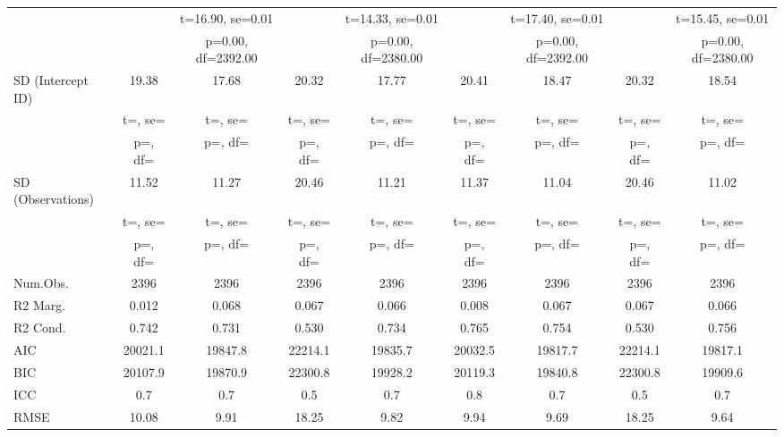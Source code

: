 \documentclass[]{report}
\begin{document}
\begin{table}
{\begin{tabular}[t]{lcccccccc}
			&  & t=\num{16.90}, se=\num{0.01} &  & t=\num{14.33}, se=\num{0.01} &  & t=\num{17.40}, se=\num{0.01} &  & t=\num{15.45}, se=\num{0.01}\\
			&  & p=\num{0.00}, df=\num{2392.00} &  & p=\num{0.00}, df=\num{2380.00} &  & p=\num{0.00}, df=\num{2392.00} &  & p=\num{0.00}, df=\num{2380.00}\\
			SD (Intercept ID) & \num{19.38} & \num{17.68} & \num{20.32} & \num{17.77} & \num{20.41} & \num{18.47} & \num{20.32} & \num{18.54}\\
			& t=, se= & t=, se= & t=, se= & t=, se= & t=, se= & t=, se= & t=, se= & t=, \vphantom{1} se=\\
			& p=, df= & p=, df= & p=, df= & p=, df= & p=, df= & p=, df= & p=, df= & p=, \vphantom{1} df=\\
			SD (Observations) & \num{11.52} & \num{11.27} & \num{20.46} & \num{11.21} & \num{11.37} & \num{11.04} & \num{20.46} & \num{11.02}\\
			& t=, se= & t=, se= & t=, se= & t=, se= & t=, se= & t=, se= & t=, se= & t=, se=\\
			& p=, df= & p=, df= & p=, df= & p=, df= & p=, df= & p=, df= & p=, df= & p=, df=\\
			\midrule
			Num.Obs. & \num{2396} & \num{2396} & \num{2396} & \num{2396} & \num{2396} & \num{2396} & \num{2396} & \num{2396}\\
			R2 Marg. & \num{0.012} & \num{0.068} & \num{0.067} & \num{0.066} & \num{0.008} & \num{0.067} & \num{0.067} & \num{0.066}\\
			R2 Cond. & \num{0.742} & \num{0.731} & \num{0.530} & \num{0.734} & \num{0.765} & \num{0.754} & \num{0.530} & \num{0.756}\\
			AIC & \num{20021.1} & \num{19847.8} & \num{22214.1} & \num{19835.7} & \num{20032.5} & \num{19817.7} & \num{22214.1} & \num{19817.1}\\
			BIC & \num{20107.9} & \num{19870.9} & \num{22300.8} & \num{19928.2} & \num{20119.3} & \num{19840.8} & \num{22300.8} & \num{19909.6}\\
			ICC & \num{0.7} & \num{0.7} & \num{0.5} & \num{0.7} & \num{0.8} & \num{0.7} & \num{0.5} & \num{0.7}\\
			RMSE & \num{10.08} & \num{9.91} & \num{18.25} & \num{9.82} & \num{9.94} & \num{9.69} & \num{18.25} & \num{9.64}\\
			\bottomrule
	\end{tabular}}
\end{table}
\end{document}
